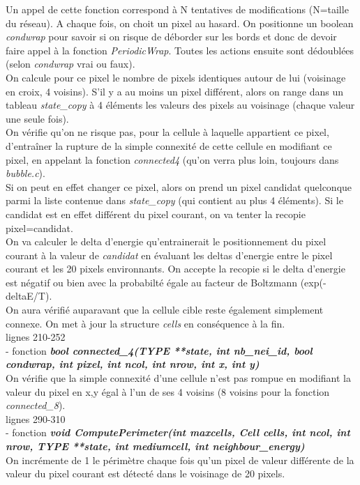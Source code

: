 \documentclass[11pt,a4paper]{article}
\begin{document}
Un appel de cette fonction correspond à N tentatives de modifications (N=taille du réseau).
A chaque fois, on choit un pixel au hasard. On positionne un boolean \textit{condwrap} pour savoir si on risque de déborder sur les bords et donc de devoir faire appel à la fonction \textit{PeriodicWrap}. Toutes les actions ensuite sont dédoublées (selon \textit{condwrap} vrai ou faux).\\
On calcule pour ce pixel le nombre de pixels identiques autour de lui (voisinage en croix, 4 voisins). 
S’il y a au moins un pixel différent, alors on range dans un tableau \textit{state\_copy} à 4 éléments les valeurs des pixels au voisinage (chaque valeur une seule fois).\\
On vérifie qu’on ne risque pas, pour la cellule à laquelle appartient ce pixel, d’entraîner la rupture de la simple connexité de cette cellule en modifiant ce pixel, en appelant la fonction \textit{connected4} (qu’on verra plus loin, toujours dans \textit{bubble.c}).\\
Si on peut en effet changer ce pixel, alors on prend un pixel candidat quelconque parmi la liste contenue dans \textit{state\_copy} (qui contient au plus 4 éléments). Si le candidat est en effet différent du pixel courant, on va tenter la recopie pixel=candidat.\\
On va calculer le delta d’energie qu’entrainerait le positionnement du pixel courant à la valeur de \textit{candidat} en évaluant les deltas d’energie entre le pixel courant et les 20 pixels environnants. On accepte la recopie si le delta d’energie est négatif ou bien avec la probabilté égale au facteur de Boltzmann (exp(-deltaE/T).\\
On aura vérifié auparavant que la cellule cible reste également simplement connexe.
On met à jour la structure \textit{cells} en conséquence à la fin.\\


lignes 210-252\\
- fonction \textbf{\textit{bool connected\_4(TYPE **state, int nb\_nei\_id, bool condwrap, int pixel, int ncol, int nrow, int x, int y)}}\\
On vérifie que la simple connexité d’une cellule n’est pas rompue en modifiant la valeur du pixel en x,y égal à l’un de ses 4 voisins (8 voisins pour la fonction \textit{connected\_8}).\\

lignes 290-310\\
- fonction \textbf{\textit{void ComputePerimeter(int maxcells, Cell cells, int ncol, int nrow, TYPE **state, int mediumcell, int neighbour\_energy)}}\\
On incrémente de 1 le périmètre chaque fois qu'un pixel de valeur différente de la valeur du pixel courant est détecté dans le voisinage de 20 pixels. \\
\end{document}
